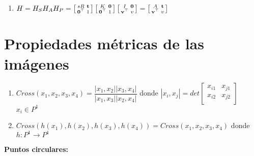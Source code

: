 \documentclass[12pt,a4paper]{article}
\begin{document}
\begin{itemize}
\begin{enumerate}
		\item $H = H_{S}H_{A}H_{P} = \left[ {\begin{smallmatrix}
		 sR & {\bf t}\\
		 {\bf 0}^{\top} & 1 \\
		\end{smallmatrix} } \right]\left[ {\begin{smallmatrix}
		 K & {\bf 0}\\
		 {\bf 0}^{\top} & 1 \\
		\end{smallmatrix} } \right]\left[ {\begin{smallmatrix}
		 I & {\bf 0}\\
		 {\bf v}^{\top} & v \\
		\end{smallmatrix} } \right]=\left[ {\begin{smallmatrix}
		 A & {\bf t}\\
		 {\bf v}^{\top} & v \\
		\end{smallmatrix} } \right]
		$
	\end{enumerate}
\end{itemize}

\section{Propiedades m\'etricas de las im\'agenes}

\begin{enumerate}
	\item $Cross(x_{1}, x_{2}, x_{3}, x_{4}) = \dfrac{|x_{1},x_{2}||x_{3},x_{4}|}{|x_{1},x_{3}||x_{2},x_{4}|}$ donde $|x_{i},x_{j}| = det \left[ {\begin{smallmatrix}
	 x_{i1} & x_{j1}\\
	 x_{i2} & x_{j2} \\
	\end{smallmatrix} } \right]$ $x_{i} \in P^{1}$

\item $Cross(h(x_{1}), h(x_{2}), h(x_{3}), h(x_{4})) = Cross(x_{1}, x_{2}, x_{3}, x_{4})$ donde $h:P^{1} \rightarrow P^{1}$
\end{enumerate}

{\bf Puntos circulares:}
\end{document}
